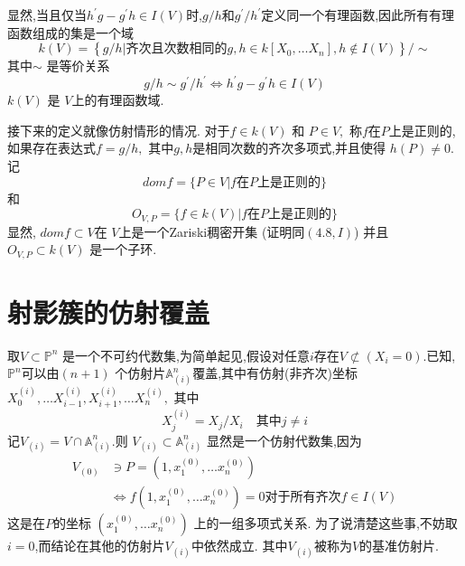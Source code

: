 \documentclass[UTF8]{book}
\begin{document}
		
		显然,当且仅当$h ^{\prime} g - g ^{\prime} h \in I ( V )$时,$g / h$和$g ^{\prime} / h ^{\prime}$定义同一个有理函数,因此所有有理函数组成的集是一个域
		\begin{equation*}
		k ( V )=\left\{ g / h | \text {齐次且次数相同的} g , h \in k \left[ X _{0}, \ldots X _{ n }\right], h \notin I ( V )\right\} / \sim
		\end{equation*}
		其中$\sim$ 是等价关系
		\begin{equation*}
		g / h \sim g ^{\prime} / h ^{\prime} \Longleftrightarrow h ^{\prime} g - g ^{\prime} h \in I ( V )
		\end{equation*}
		$k ( V )$ 是 $V$上的有理函数域. 
		
		
		接下来的定义就像仿射情形的情况. 对于$f \in k ( V )$ 和 $P \in V ,$ 称$f$在$P$上是正则的,如果存在表达式$f = g / h ,$ 其中$g , h$是相同次数的齐次多项式,并且使得 $h ( P ) \neq 0 .$ 记
		\begin{equation*}
		dom f =\{ P \in V | f \text {在} P \text{上是正则的}\}
		\end{equation*}
		和
		\begin{equation*}
		O _{ V , P }=\{ f \in k ( V ) | f \text {在} P \text{上是正则的}\}
		\end{equation*}
		显然, $dom f \subset V$在 $V$上是一个Zariski稠密开集 (证明同$(4.8, I )$) 并且$O _{ V , P } \subset k ( V )$ 是一个子环.
		
	\section{射影簇的仿射覆盖}
	
		取$V \subset \mathbb{P}^{n}$ 是一个不可约代数集,为简单起见,假设对任意$ i $存在$V\not\subset \left(X_{i}=0\right)$.已知,$\mathbb{P}^{n}$可以由$( n +1)$ 个仿射片$\mathbb{A} ^{ n }_{( i )}$覆盖,其中有仿射(非齐次)坐标$X _{0}^{( i )}, \ldots X _{ i -1}^{( i )}, X _{ i +1}^{( i )}, \ldots X _{ n }^{( i )},$ 其中
		\begin{equation*}
		X _{ j }^{( i )}= X _{ j } / X _{ i } \quad \text {其中} j \neq i
		\end{equation*}
		记$V_{(i)}=V \cap \mathbb{A}^{n}_{(i)} .$则 $V_{(i)} \subset \mathbb{A}^{n}_{(i)}$ 显然是一个仿射代数集,因为
		\begin{equation*}
		\begin{aligned}
		V _{(0)} & \ni P =\left(1, x _{1}^{(0)}, \ldots x_{ n} ^{(0)}\right) \\
		& \Longleftrightarrow f \left(1, x _{1}^{(0)}, \ldots x _{ n }^{(0)}\right)=0  \text {对于所有齐次} f \in I ( V )
		\end{aligned}
		\end{equation*}
		这是在$ P $的坐标 $\left(x_{1}^{(0)}, \ldots x_{n}^{(0)}\right)$ 上的一组多项式关系. 为了说清楚这些事,不妨取$i =0$,而结论在其他的仿射片$V _{( i )} $中依然成立. 其中$V _{( i )}$被称为$V$的基准仿射片.
		
\end{document}
